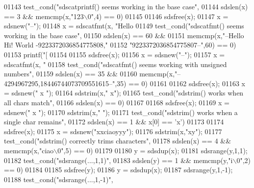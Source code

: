 \begin{DoxyCode}
{{{{{{{{{{{{{{{{{01143         test\_cond(\textcolor{stringliteral}{"sdscatprintf() seems working in the base case"},
01144             sdslen(x) == 3 && memcmp(x,\textcolor{stringliteral}{"123\(\backslash\)0"},4) == 0)
01145 
01146         sdsfree(x);
01147         x = sdsnew(\textcolor{stringliteral}{"--"});
01148         x = sdscatfmt(x, \textcolor{stringliteral}{"Hello %
01149         test\_cond(\textcolor{stringliteral}{"sdscatfmt() seems working in the base case"},
01150             sdslen(x) == 60 &&
01151             memcmp(x,\textcolor{stringliteral}{"--Hello Hi! World -9223372036854775808,"}
01152                      \textcolor{stringliteral}{"9223372036854775807--"},60) == 0)
01153         printf(\textcolor{stringliteral}{"[%
01154 
01155         sdsfree(x);
01156         x = sdsnew(\textcolor{stringliteral}{"--"});
01157         x = sdscatfmt(x, \textcolor{stringliteral}{"%
01158         test\_cond(\textcolor{stringliteral}{"sdscatfmt() seems working with unsigned numbers"},
01159             sdslen(x) == 35 &&
01160             memcmp(x,\textcolor{stringliteral}{"--4294967295,18446744073709551615--"},35) == 0)
01161 
01162         sdsfree(x);
01163         x = sdsnew(\textcolor{stringliteral}{" x "});
01164         sdstrim(x,\textcolor{stringliteral}{" x"});
01165         test\_cond(\textcolor{stringliteral}{"sdstrim() works when all chars match"},
01166             sdslen(x) == 0)
01167 
01168         sdsfree(x);
01169         x = sdsnew(\textcolor{stringliteral}{" x "});
01170         sdstrim(x,\textcolor{stringliteral}{" "});
01171         test\_cond(\textcolor{stringliteral}{"sdstrim() works when a single char remains"},
01172             sdslen(x) == 1 && x[0] == \textcolor{stringliteral}{'x'})
01173 
01174         sdsfree(x);
01175         x = sdsnew(\textcolor{stringliteral}{"xxciaoyyy"});
01176         sdstrim(x,\textcolor{stringliteral}{"xy"});
01177         test\_cond(\textcolor{stringliteral}{"sdstrim() correctly trims characters"},
01178             sdslen(x) == 4 && memcmp(x,\textcolor{stringliteral}{"ciao\(\backslash\)0"},5) == 0)
01179 
01180         y = sdsdup(x);
01181         sdsrange(y,1,1);
01182         test\_cond(\textcolor{stringliteral}{"sdsrange(...,1,1)"},
01183             sdslen(y) == 1 && memcmp(y,\textcolor{stringliteral}{"i\(\backslash\)0"},2) == 0)
01184 
01185         sdsfree(y);
01186         y = sdsdup(x);
01187         sdsrange(y,1,-1);
01188         test\_cond(\textcolor{stringliteral}{"sdsrange(...,1,-1)"},
}}}}}}}}}}}}}}}}}}}}
\end{DoxyCode}
